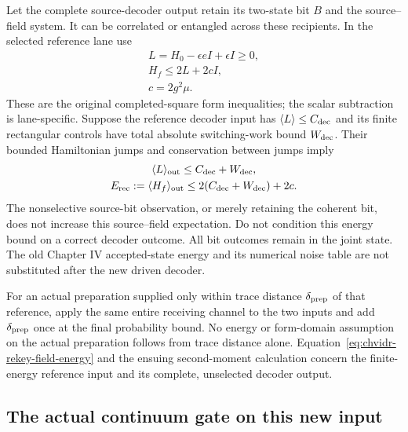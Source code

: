 Let the complete source-decoder output retain its two-state bit $B$ and
the source--field system. It can be correlated or entangled across these
recipients. In the selected reference lane use
\begin{equation}
\begin{gathered}
L=H_0-\epsilon eI+\epsilon I\geq0,
 \\
 H_f\leq2L+2cI,\\
 c=2g^2\mu.
\end{gathered}
\label{eq:chvidr-source-positive-energy}
\end{equation}
These are the original completed-square form inequalities; the scalar
subtraction is lane-specific. Suppose the reference decoder input has
$\langle L\rangle\leq C_{\rm dec}$ and its finite rectangular controls
have total absolute switching-work bound $W_{\rm dec}$. Their bounded
Hamiltonian jumps and conservation between jumps imply
\begin{equation}
\begin{gathered}
\langle L\rangle_{\rm out}\leq C_{\rm dec}+W_{\rm dec},
 \\
 E_{\rm rec}:=\langle H_f\rangle_{\rm out}
       \leq2(C_{\rm dec}+W_{\rm dec})+2c.
\end{gathered}
\label{eq:chvidr-rekey-field-energy}
\end{equation}
The nonselective source-bit observation, or merely retaining the coherent
bit, does not increase this source--field expectation. Do not condition
this energy bound on a correct decoder outcome. All bit outcomes remain
in the joint state. The old Chapter IV accepted-state energy and its
numerical noise table are not substituted after the new driven decoder.

For an actual preparation supplied only within trace distance
$\delta_{\rm prep}$ of that reference, apply the same entire receiving
channel to the two inputs and add $\delta_{\rm prep}$ once at the final
probability bound. No energy or form-domain assumption on the actual
preparation follows from trace distance alone. Equation~\eqref{eq:chvidr-rekey-field-energy}
and the ensuing second-moment calculation concern the finite-energy
reference input and its complete, unselected decoder output.

\subsection{The actual continuum gate on this new input}
\label{sec:chvidr-actual-pointer-input}

